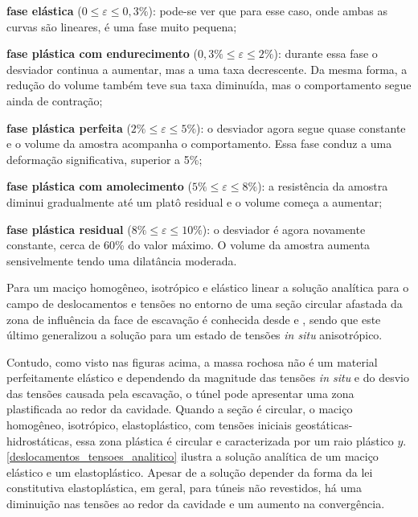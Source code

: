 \begin{alineas}
	
	\item \textbf{fase elástica} ($0\le \varepsilon \le 0,3\%$): pode-se ver que para esse caso, onde ambas as curvas são lineares, é uma fase muito pequena;
	
	\item \textbf{fase plástica com endurecimento} ($0,3\%\le \varepsilon \le 2\%$): durante essa fase o desviador continua a aumentar, mas a uma taxa decrescente. Da mesma forma, a redução do volume também teve sua taxa diminuída, mas o comportamento segue ainda de contração;
	
	\item \textbf{fase plástica perfeita} ($2\%\le \varepsilon \le 5\%$): o desviador agora segue quase constante e o volume da amostra acompanha o comportamento. Essa fase conduz a uma deformação significativa, superior a 5\%;
	
	\item \textbf{fase plástica com amolecimento} ($5\%\le \varepsilon \le 8\%$): a resistência da amostra diminui gradualmente até um platô residual e o volume começa a aumentar;
	
	\item \textbf{fase plástica residual} ($8\%\le \varepsilon \le 10\%$): o desviador é agora novamente constante, cerca de 60\% do valor máximo. O volume da amostra aumenta sensivelmente tendo uma dilatância moderada.
	
\end{alineas}

Para um maciço homogêneo, isotrópico e elástico linear a solução analítica para o campo de deslocamentos e tensões no entorno de uma seção circular afastada da zona de influência da face de escavação é conhecida desde  e , sendo que este último generalizou a solução para um estado de tensões \textit{in situ} anisotrópico. 

Contudo, como visto nas figuras acima, a massa rochosa não é um material perfeitamente elástico e dependendo da magnitude das tensões \textit{in situ} e do desvio das tensões causada pela escavação, o túnel pode apresentar uma zona plastificada ao redor da cavidade. Quando a seção é circular, o maciço homogêneo, isotrópico, elastoplástico, com tensões iniciais geostáticas-hidrostáticas, essa zona plástica é circular e caracterizada por um raio plástico $y$. \autoref{deslocamentos_tensoes_analitico} ilustra a solução analítica de um maciço elástico e um elastoplástico. Apesar de a solução depender da forma da lei constitutiva elastoplástica, em geral, para túneis não revestidos, há uma diminuição nas tensões ao redor da cavidade e um aumento na convergência.

